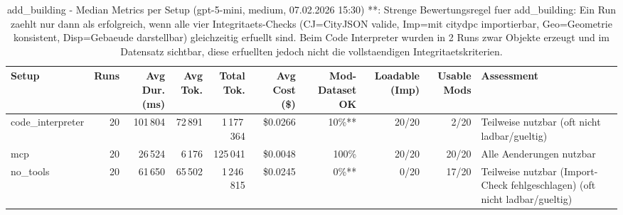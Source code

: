 \documentclass[a4paper,11pt]{article}
\begin{document}
\begin{table}[H]
\centering
\scriptsize
\caption{add\_building - Median Metrics per Setup (gpt-5-mini, medium, 07.02.2026 15:30) **: Strenge Bewertungsregel fuer add\_building: Ein Run zaehlt nur dann als erfolgreich, wenn alle vier Integritaets-Checks (CJ=CityJSON valide, Imp=mit citydpc importierbar, Geo=Geometrie konsistent, Disp=Gebaeude darstellbar) gleichzeitig erfuellt sind. Beim Code Interpreter wurden in 2 Runs zwar Objekte erzeugt und im Datensatz sichtbar, diese erfuellten jedoch nicht die vollstaendigen Integritaetskriterien.}
\label{tab:combined\_add\_building\_metrics\_20260207}
\begin{tabular}{l r r r r r r r r l}
\toprule
Setup & Runs & Avg Dur. (ms) & Avg Tok. & Total Tok. & Avg Cost (\$) & Mod-Dataset OK & Loadable (Imp) & Usable Mods & Assessment \\
\midrule
code\_interpreter & 20 & 101\,804 & 72\,891 & 1\,177\,364 & \$0.0266 & 10\%** & 20/20 & 2/20 & Teilweise nutzbar (oft nicht ladbar/gueltig) \\
mcp & 20 & 26\,524 & 6\,176 & 125\,041 & \$0.0048 & 100\% & 20/20 & 20/20 & Alle Aenderungen nutzbar \\
no\_tools & 20 & 61\,650 & 65\,502 & 1\,246\,815 & \$0.0245 & 0\%** & 0/20 & 17/20 & Teilweise nutzbar (Import-Check fehlgeschlagen) (oft nicht ladbar/gueltig) \\
\bottomrule
\end{tabular}
\end{table}
\end{document}
